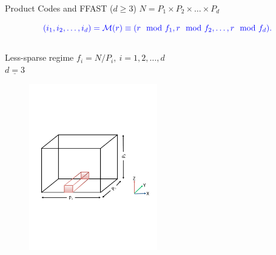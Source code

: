 \documentclass[10pt,xcolor=table]{beamer}
\begin{document}
	\begin{frame}{Product Codes and FFAST ($d \geq 3$)}
	\color{blue}$N= P_1 \times P_2 \times \ldots \times P_d$
	
	\[\color{blue} (i_1,i_2,\ldots, i_d) = \mathcal{M}(r) \equiv (r \mod f_1, r \mod f_2, \ldots, r \mod f_d ).
	\]
	
	\begin{columns}
		\begin{block}{Less-sparse regime}
			\color{red} $f_i= N/P_i,\ i=1,2, \ldots,d$\\ \vspace{0.2in}
			\vspace{-2mm}
			\color{blue} $\underline{d=3}$
			\vspace{-3mm}
			\begin{figure}[t]
				\centering
				\includegraphics[width=2.2in]{./Figures/less-sparse}
			\end{figure}
			

\end{block}
\end{columns}
\end{frame}
\end{document}
